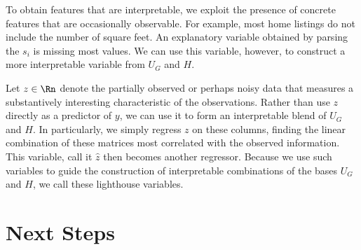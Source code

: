 \documentclass[12pt]{article}
\begin{document}
 To obtain features that are interpretable, we exploit the presence of
 concrete features that are occasionally observable.  For example,
 most home listings do not include the number of square feet.  An
 explanatory variable obtained by parsing the $s_i$ is missing most
 values.  We can use this variable, however, to construct a more
 interpretable variable from $U_G$ and $H$.  


 Let $z \in \Rn$ denote the partially observed or perhaps noisy data
 that measures a substantively interesting characteristic of the
 observations.  Rather than use $z$ directly as a predictor of $y$, we
 can use it to form an interpretable blend of $U_G$ and $H$.  In
 particularly, we simply regress $z$ on these columns, finding the
 linear combination of these matrices most correlated with the
 observed information.  This variable, call it $\hat{z}$ then becomes
 another regressor.  Because we use such variables to guide the
 construction of interpretable combinations of the bases $U_G$ and
 $H$, we call these lighthouse variables.



\section{Next Steps}
\label{sec:disc}
  
\end{document}
